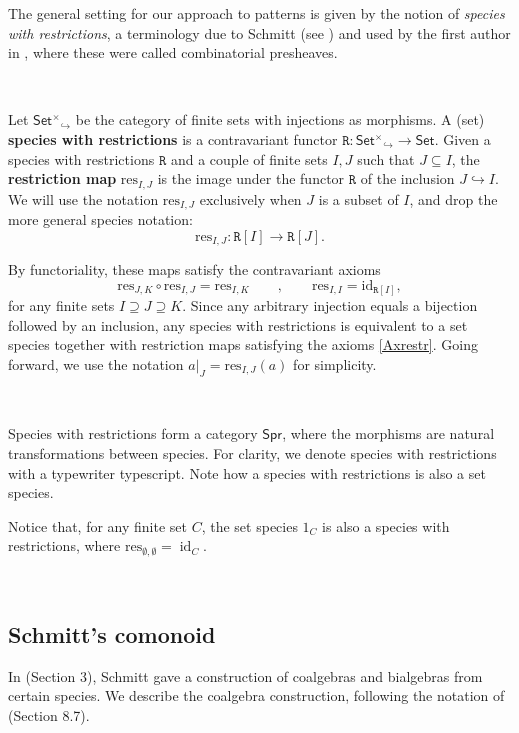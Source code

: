 \documentclass[12pt, reqno]{amsart}
\theoremstyle{definition}
\DeclareMathOperator{\id}{id}
\newcommand{\Fset}{\mathsf{Set^{\times}}}
\newcommand{\Set}{\mathsf{Set}}
\newcommand{\Spr}{\mathsf{Spr}} %
\newcommand{\prR}{\mathtt{R}}
\begin{document}
The general setting for our approach to patterns is given by the notion of \emph{species with restrictions}, a terminology due to Schmitt (see \cite{Schmitt1993}) and used by the first author in \cite{Penaguiao2020}, where these were called combinatorial presheaves.

\

Let $\Fset_{\!\!\!\!\!\hookrightarrow}$ be the category of finite sets with injections as morphisms. A (set) {\bf species with restrictions} is a contravariant functor $\prR:\Fset_{\!\!\!\!\!\hookrightarrow} \to \Set$. Given a species with restrictions $\prR$ and a couple of finite sets $I,J$ such that $J \subseteq I$, the {\bf restriction map} $\text{res}_{I,J}$ is the image under the functor $\prR$ of the inclusion $J \hookrightarrow I$. We will use the notation $\text{res}_{I,J}$ exclusively when $J$ is a subset of $I$, and drop the more general species notation:
\[\text{res}_{I,J}: \prR[I]\to \prR[J].\]

By functoriality, these maps satisfy the contravariant axioms
\begin{equation}\label{Axrestr}
    \text{res}_{J,K}\circ\text{res}_{I,J}=\text{res}_{I,K} \qquad , \qquad \text{res}_{I,I}=\text{id}_{\prR[I]},
\end{equation}
for any finite sets $I \supseteq J \supseteq K$. 
Since any arbitrary injection equals a bijection followed by an inclusion, any species with restrictions is equivalent to a set species together with restriction maps satisfying the axioms \eqref{Axrestr}.
Going forward, we use the notation $a|_J = \text{res}_{I, J}(a)$ for simplicity.


\

Species with restrictions form a category $\Spr$, where the morphisms are natural transformations between species.
For clarity, we denote species with restrictions with a typewriter typescript.
Note how a species with restrictions is also a set species.

Notice that, for any finite set $C$, the set species $\mathrm{1}_C$ is also a species with restrictions, where $\text{res}_{\emptyset, \emptyset} = \id_C$.

\

\subsection{Schmitt's comonoid}
In \cite{Schmitt1993} (Section 3), Schmitt gave a construction of coalgebras and bialgebras from certain species. We describe the coalgebra construction, following the notation of \cite{AM2010} (Section 8.7).
\end{document}

